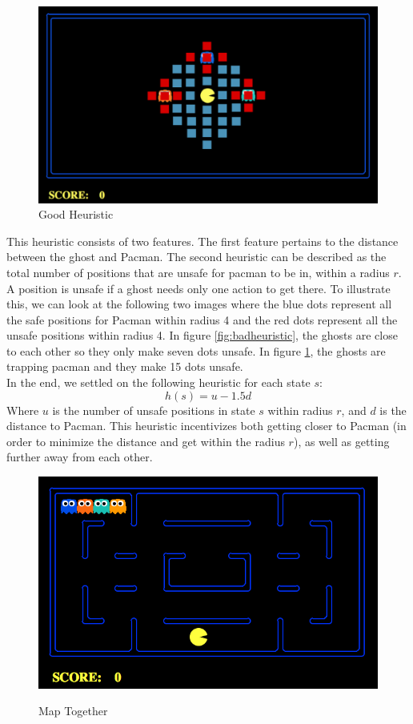 \documentclass[11pt]{article}
\begin{document}
\begin{multicols}{2}
\begin{figure}
	\includegraphics[width=\columnwidth]{goodheuristic.png}
	\caption{Good Heuristic}
	\label{fig:goodheuristic}
\end{figure}

This heuristic consists of two features. The first feature pertains to the distance between the ghost and Pacman. The second heuristic can be described as the total number of positions that are unsafe for pacman to be in, within a radius $r$. A position is unsafe if a ghost needs only one action to get there. To illustrate this, we can look at the following two images where the blue dots represent all the safe positions for Pacman within radius 4 and the red dots represent all the unsafe positions within radius 4. In figure \ref{fig:badheuristic}, the ghosts are close to each other so they only make seven dots unsafe. In figure \ref{fig:goodheuristic}, the ghosts are trapping pacman and they make 15 dots unsafe.\\ 

In the end, we settled on the following heuristic for each state $s$:
$$h(s) = u - 1.5d$$ Where $u$ is the number of unsafe positions in state $s$ within radius $r$, and $d$ is the distance to Pacman. This heuristic incentivizes both getting closer to Pacman (in order to minimize the distance and get within the radius $r$), as well as getting further away from each other.

\begin{figure}
	\includegraphics[width=\columnwidth]{maptogether.png}\\
	\caption{Map Together}
	\label{fig:maptogether}
\end{figure}


\end{multicols}
\end{document}
